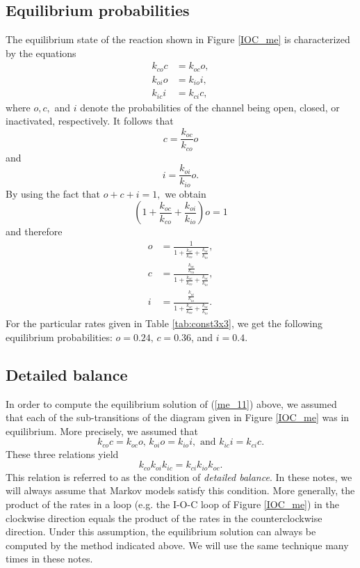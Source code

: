 \subsection{Equilibrium probabilities \label{eq_prob_ioc}}

The equilibrium state of the
reaction shown in Figure  \ref{IOC_me} is characterized by the equations%
\begin{align}
k_{co}c  &  =k_{oc}o, \nonumber\\
k_{oi}o  &  =k_{io}i, \label{me_eq_20}\\
k_{ic}i  &  =k_{ci}c, \nonumber
\end{align}
where $o,c,$ and $i$ denote the probabilities of the channel being open,
closed, or inactivated, respectively. It follows that%
\[
c=\frac{k_{oc}}{k_{co}}o
\]
and
\[
i=\frac{k_{oi}}{k_{io}}o.
\]
By using the fact that $o+c+i=1,$ we obtain
\[
\left(  1+\frac{k_{oc}}{k_{co}}+\frac{k_{oi}}{k_{io}}\right)  o=1
\]
and therefore%
\begin{align*}
o  &  =\frac{1}{1+\frac{k_{oc}}{k_{co}}+\frac{k_{oi}}{k_{io}}},\\
c  &  =\frac{\frac{k_{oc}}{k_{co}}}{1+\frac{k_{oc}}{k_{co}}+\frac{k_{oi}%
}{k_{io}}},\\
i  &  =\frac{\frac{k_{oi}}{k_{io}}}{1+\frac{k_{oc}}{k_{co}}+\frac{k_{oi}%
}{k_{io}}}.
\end{align*}
For the particular rates given in Table \ref{tab:const3x3}, we get the following equilibrium probabilities: $o=0.24,\, c=0.36$, and
$i=0.4$.

\subsection{Detailed balance}

In order to compute the equilibrium solution of (\ref{me_11}) above, we assumed that each of the sub-transitions of the diagram given in Figure \ref{IOC_me} was in equilibrium. More precisely, we assumed that
\[k_{co}c    =k_{oc}o, \, k_{oi}o =k_{io}i,  \text{ and }k_{ic}i =k_{ci}c. \]
These three relations yield
\begin{equation}
k_{co}k_{oi}k_{ic}=k_{ci}k_{io}k_{oc}. \label {db}
\end{equation}
This relation is referred to as the condition of {\it detailed balance}. In these notes, we will always assume that Markov models satisfy this condition. More generally, the product of the rates in a loop (e.g. the I-O-C loop of Figure \ref{IOC_me}) in the clockwise direction equals the product of the rates in the counterclockwise direction. Under this assumption, the equilibrium solution can always be computed by the method indicated above. We will use the same technique many times in these notes.



